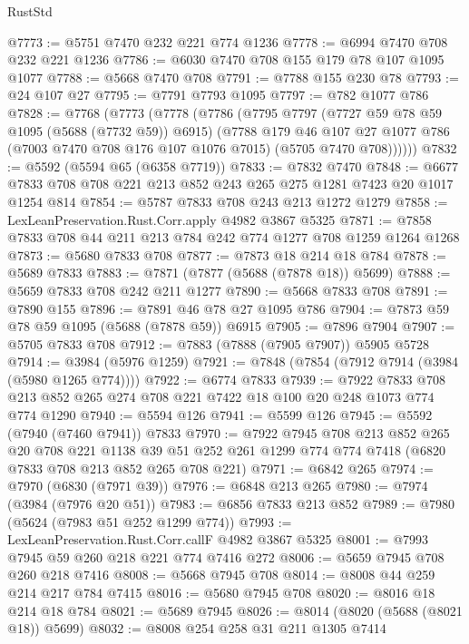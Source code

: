\begin{lexlean}{RustStd}
\begin{coremodule}
@7773 := @5751 @7470 @232 @221 @774 @1236
@7778 := @6994 @7470 @708 @232 @221 @1236
@7786 := @6030 @7470 @708 @155 @179 @78 @107 @1095 @1077
@7788 := @5668 @7470 @708
@7791 := @7788 @155 @230 @78
@7793 := @24 @107 @27
@7795 := @7791 @7793 @1095
@7797 := @782 @1077 @786
@7828 := @7768
    (@7773
      (@7778
        (@7786
          (@7795
            @7797
            (@7727 @59 @78 @59 @1095 (@5688 (@7732 @59)) @6915)
            (@7788
              @179
              @46
              @107
              @27
              @1077
              @786
              (@7003 @7470 @708 @176 @107 @1076 @7015)
              (@5705 @7470 @708))))))
@7832 := @5592 (@5594 @65 (@6358 @7719))
@7833 := @7832 @7470
@7848 := @6677 @7833 @708 @708 @221 @213 @852 @243 @265 @275 @1281 @7423 @20 @1017 @1254 @814
@7854 := @5787 @7833 @708 @243 @213 @1272 @1279
@7858 := LexLeanPreservation.Rust.Corr.apply @4982 @3867 @5325
@7871 := @7858 @7833 @708 @44 @211 @213 @784 @242 @774 @1277 @708 @1259 @1264 @1268
@7873 := @5680 @7833 @708
@7877 := @7873 @18 @214 @18 @784
@7878 := @5689 @7833
@7883 := @7871 (@7877 (@5688 (@7878 @18)) @5699)
@7888 := @5659 @7833 @708 @242 @211 @1277
@7890 := @5668 @7833 @708
@7891 := @7890 @155
@7896 := @7891 @46 @78 @27 @1095 @786
@7904 := @7873 @59 @78 @59 @1095 (@5688 (@7878 @59)) @6915
@7905 := @7896 @7904
@7907 := @5705 @7833 @708
@7912 := @7883 (@7888 (@7905 @7907)) @5905 @5728
@7914 := @3984 (@5976 @1259)
@7921 := @7848 (@7854 (@7912 @7914 (@3984 (@5980 @1265 @774))))
@7922 := @6774 @7833
@7939 := @7922
    @7833
    @708
    @213
    @852
    @265
    @274
    @708
    @221
    @7422
    @18
    @100
    @20
    @248
    @1073
    @774
    @774
    @1290
@7940 := @5594 @126
@7941 := @5599 @126
@7945 := @5592 (@7940 (@7460 @7941)) @7833
@7970 := @7922
    @7945
    @708
    @213
    @852
    @265
    @20
    @708
    @221
    @1138
    @39
    @51
    @252
    @261
    @1299
    @774
    @774
    @7418
    (@6820 @7833 @708 @213 @852 @265 @708 @221)
@7971 := @6842 @265
@7974 := @7970 (@6830 (@7971 @39))
@7976 := @6848 @213 @265
@7980 := @7974 (@3984 (@7976 @20 @51))
@7983 := @6856 @7833 @213 @852
@7989 := @7980 (@5624 (@7983 @51 @252 @1299 @774))
@7993 := LexLeanPreservation.Rust.Corr.callF @4982 @3867 @5325
@8001 := @7993 @7945 @59 @260 @218 @221 @774 @7416 @272
@8006 := @5659 @7945 @708 @260 @218 @7416
@8008 := @5668 @7945 @708
@8014 := @8008 @44 @259 @214 @217 @784 @7415
@8016 := @5680 @7945 @708
@8020 := @8016 @18 @214 @18 @784
@8021 := @5689 @7945
@8026 := @8014 (@8020 (@5688 (@8021 @18)) @5699)
@8032 := @8008 @254 @258 @31 @211 @1305 @7414

\end{coremodule}
\end{lexlean}
